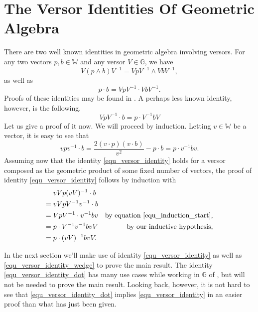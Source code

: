 \documentclass{birkjour}
\theoremstyle{definition}
\theoremstyle{remark}
\numberwithin{equation}{section}
\newcommand{\G}{\mathbb{G}}
\newcommand{\W}{\mathbb{W}}
\begin{document}
\section{The Versor Identities Of Geometric Algebra}

There are two well known identities in geometric algebra involving versors.
For any two vectors $p,b\in\W$ and any versor $V\in\G$, we have
\begin{equation}\label{equ_versor_identity_wedge}
V(p\wedge b)V^{-1} = VpV^{-1}\wedge VbV^{-1},
\end{equation}
as well as
\begin{equation}\label{equ_versor_identity_dot}
p\cdot b = VpV^{-1}\cdot VbV^{-1}.
\end{equation}
Proofs of these identities may be found in \cite{Parkin12_intro}.
A perhaps less known identity, however, is the following.
\begin{equation}\label{equ_versor_identity}
VpV^{-1}\cdot b = p\cdot V^{-1}bV
\end{equation}
Let us give a proof of it now.  We will proceed by induction.
Letting $v\in\W$ be a vector, it is easy to see that
\begin{equation}\label{equ_induction_start}
vpv^{-1}\cdot b = \frac{2(v\cdot p)(v\cdot b)}{v^2} - p\cdot b = p\cdot v^{-1}bv.
\end{equation}
Assuming now that the identity \eqref{equ_versor_identity} holds for a versor
composed as the geometric product of some fixed number of vectors, the proof of identity
\eqref{equ_versor_identity} follows by induction with
\begin{align}
& vVp(vV)^{-1}\cdot b \\
=\;& vVpV^{-1}v^{-1}\cdot b \\
=\;& VpV^{-1}\cdot v^{-1}bv & \mbox{by equation \eqref{equ_induction_start},} \\
=\;& p\cdot V^{-1}v^{-1}bvV & \mbox{by our inductive hypothesis,} \\
=\;& p\cdot (vV)^{-1}bvV.
\end{align}

In the next section we'll make use of identity \eqref{equ_versor_identity} as well as
\eqref{equ_versor_identity_wedge} to prove the main result.  The identity
\eqref{equ_versor_identity_dot} has many use cases while working in $\G$
of \cite{Parkin12}, but will not be needed to prove the main result.
Looking back, however, it is not hard to see that \eqref{equ_versor_identity_dot}
implies \eqref{equ_versor_identity} in an easier proof than what has just been given.
\end{document}
